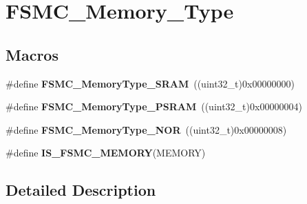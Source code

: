\hypertarget{group___f_s_m_c___memory___type}{\section{F\-S\-M\-C\-\_\-\-Memory\-\_\-\-Type}
\label{group___f_s_m_c___memory___type}
}
\subsection*{Macros}
\begin{DoxyCompactItemize}
\item 
\hypertarget{group___f_s_m_c___memory___type_ga8a24e8da42e67dcf6fb2f43659aa49cf}{\#define {\bfseries F\-S\-M\-C\-\_\-\-Memory\-Type\-\_\-\-S\-R\-A\-M}~((uint32\-\_\-t)0x00000000)}\label{group___f_s_m_c___memory___type_ga8a24e8da42e67dcf6fb2f43659aa49cf}

\item 
\hypertarget{group___f_s_m_c___memory___type_gae3e680998b2fee8d56222634f5268a75}{\#define {\bfseries F\-S\-M\-C\-\_\-\-Memory\-Type\-\_\-\-P\-S\-R\-A\-M}~((uint32\-\_\-t)0x00000004)}\label{group___f_s_m_c___memory___type_gae3e680998b2fee8d56222634f5268a75}

\item 
\hypertarget{group___f_s_m_c___memory___type_ga8b9390abe7c281947c550bf4365649e5}{\#define {\bfseries F\-S\-M\-C\-\_\-\-Memory\-Type\-\_\-\-N\-O\-R}~((uint32\-\_\-t)0x00000008)}\label{group___f_s_m_c___memory___type_ga8b9390abe7c281947c550bf4365649e5}

\item 
\#define {\bfseries I\-S\-\_\-\-F\-S\-M\-C\-\_\-\-M\-E\-M\-O\-R\-Y}(M\-E\-M\-O\-R\-Y)
\end{DoxyCompactItemize}


\subsection{Detailed Description}


